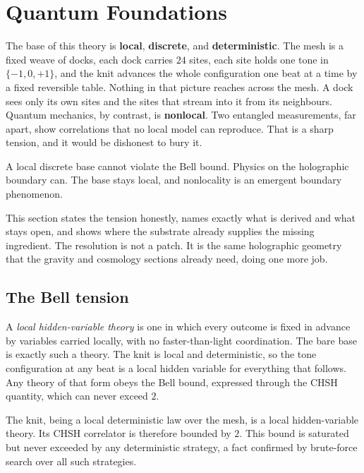 \section{Quantum Foundations}

The base of this theory is \textbf{local}, \textbf{discrete}, and \textbf{deterministic}. The mesh is a fixed weave of docks, each dock carries $24$ sites, each site holds one tone in $\{-1,0,+1\}$, and the knit advances the whole configuration one beat at a time by a fixed reversible table. Nothing in that picture reaches across the mesh. A dock sees only its own sites and the sites that stream into it from its neighbours. Quantum mechanics, by contrast, is \textbf{nonlocal}. Two entangled measurements, far apart, show correlations that no local model can reproduce. That is a sharp tension, and it would be dishonest to bury it.

\begin{principle}
A local discrete base cannot violate the Bell bound. Physics on the holographic boundary can. The base stays local, and nonlocality is an emergent boundary phenomenon.
\end{principle}

This section states the tension honestly, names exactly what is derived and what stays open, and shows where the substrate already supplies the missing ingredient. The resolution is not a patch. It is the same holographic geometry that the gravity and cosmology sections already need, doing one more job.

\subsection{The Bell tension}

A \emph{local hidden-variable theory} is one in which every outcome is fixed in advance by variables carried locally, with no faster-than-light coordination. The bare base is exactly such a theory. The knit is local and deterministic, so the tone configuration at any beat is a local hidden variable for everything that follows. Any theory of that form obeys the Bell bound, expressed through the CHSH quantity, which can never exceed $2$.

\begin{theorem}
The knit, being a local deterministic law over the mesh, is a local hidden-variable theory. Its CHSH correlator is therefore bounded by $2$. This bound is saturated but never exceeded by any deterministic strategy, a fact confirmed by brute-force search over all such strategies.
\end{theorem}

